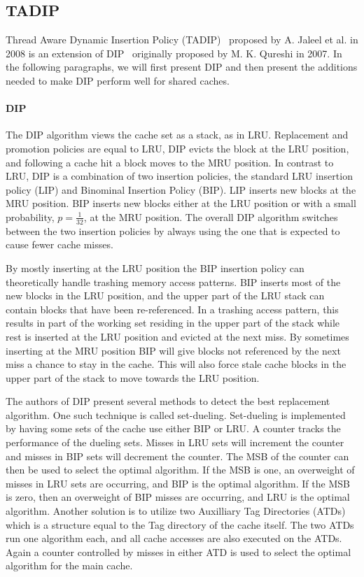 \subsection{TADIP}
\label{sec:background:algorithms:tadip}

Thread Aware Dynamic Insertion Policy (TADIP)~\cite{Jaleel2008} proposed by A. Jaleel et al. in 2008 is an extension of DIP~\cite{Qureshi2007} originally proposed by M. K. Qureshi in 2007.
In the following paragraphs, we will first present DIP and then present the additions needed to make DIP perform well for shared caches.

\paragraph{DIP}

The DIP algorithm views the cache set as a stack, as in LRU.
Replacement and promotion policies are equal to LRU, DIP evicts the block at the LRU position, and following a cache hit a block moves to the MRU position.
In contrast to LRU, DIP is a combination of two insertion policies, the standard LRU insertion policy (LIP) and Binominal Insertion Policy (BIP).
LIP inserts new blocks at the MRU position.
BIP inserts new blocks either at the LRU position or with a small probability, $p = \frac{1}{32}$, at the MRU position. 
The overall DIP algorithm switches between the two insertion policies by always using the one that is expected to cause fewer cache misses.

By mostly inserting at the LRU position the BIP insertion policy can theoretically handle trashing memory access patterns.
BIP inserts most of the new blocks in the LRU position, and the upper part of the LRU stack can contain blocks that have been re-referenced.
In a trashing access pattern, this results in part of the working set residing in the upper part of the stack while rest is inserted at the LRU position and evicted at the next miss.
By sometimes inserting at the MRU position BIP will give blocks not referenced by the next miss a chance to stay in the cache. 
This will also force stale cache blocks in the upper part of the stack to move towards the LRU position.

The authors of DIP present several methods to detect the best replacement algorithm. 
One such technique is called set-dueling.
Set-dueling is implemented by having some sets of the cache use either BIP or LRU. 
A counter tracks the performance of the dueling sets.
Misses in LRU sets will increment the counter and misses in BIP sets will decrement the counter.
The MSB of the counter can then be used to select the optimal algorithm.
If the MSB is one, an overweight of misses in LRU sets are occurring, and BIP is the optimal algorithm. 
If the MSB is zero, then an overweight of BIP misses are occurring, and LRU is the optimal algorithm.
Another solution is to utilize two Auxilliary Tag Directories (ATDs) which is a structure equal to the Tag directory of the cache itself.
The two ATDs run one algorithm each, and all cache accesses are also executed on the ATDs.
Again a counter controlled by misses in either ATD is used to select the optimal algorithm for the main cache.

